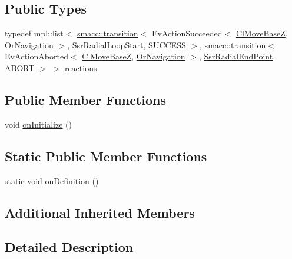\subsection*{Public Types}
\begin{DoxyCompactItemize}
\item 
typedef mpl\+::list$<$ \hyperlink{classsmacc_1_1transition}{smacc\+::transition}$<$ Ev\+Action\+Succeeded$<$ \hyperlink{classmove__base__z__client_1_1ClMoveBaseZ}{Cl\+Move\+BaseZ}, \hyperlink{classsm__dance__bot_1_1OrNavigation}{Or\+Navigation} $>$, \hyperlink{structsm__dance__bot_1_1radial__motion__states_1_1SsrRadialLoopStart}{Ssr\+Radial\+Loop\+Start}, \hyperlink{classSUCCESS}{S\+U\+C\+C\+E\+SS} $>$, \hyperlink{classsmacc_1_1transition}{smacc\+::transition}$<$ Ev\+Action\+Aborted$<$ \hyperlink{classmove__base__z__client_1_1ClMoveBaseZ}{Cl\+Move\+BaseZ}, \hyperlink{classsm__dance__bot_1_1OrNavigation}{Or\+Navigation} $>$, \hyperlink{structsm__dance__bot_1_1radial__motion__states_1_1SsrRadialEndPoint}{Ssr\+Radial\+End\+Point}, \hyperlink{classABORT}{A\+B\+O\+RT} $>$ $>$ \hyperlink{structsm__dance__bot_1_1radial__motion__states_1_1SsrRadialReturn_a85e4db9dfa0396b97a540cbe81905698}{reactions}
\end{DoxyCompactItemize}
\subsection*{Public Member Functions}
\begin{DoxyCompactItemize}
\item 
void \hyperlink{structsm__dance__bot_1_1radial__motion__states_1_1SsrRadialReturn_ae6679a43e4fd59fe4315177c88c97bcc}{on\+Initialize} ()
\end{DoxyCompactItemize}
\subsection*{Static Public Member Functions}
\begin{DoxyCompactItemize}
\item 
static void \hyperlink{structsm__dance__bot_1_1radial__motion__states_1_1SsrRadialReturn_a9e9b10cbf23a788aad70e39f314be136}{on\+Definition} ()
\end{DoxyCompactItemize}
\subsection*{Additional Inherited Members}


\subsection{Detailed Description}



